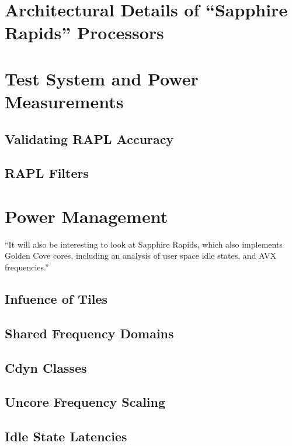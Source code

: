 \documentclass[conference,table,xcdraw,10pt,final]{IEEEtran}
\begin{document}
	\section{Architectural Details of “Sapphire Rapids” Processors}

	\section{Test System and Power Measurements}

	\subsection{Validating RAPL Accuracy}

	\subsection{RAPL Filters}

	\section{Power Management}
	``It will also be interesting to look at Sapphire Rapids, which also implements Golden Cove cores, including an analysis of user space idle states, and AVX frequencies.''

	\subsection{Infuence of Tiles}

	\subsection{Shared Frequency Domains}

	\subsection{Cdyn Classes}

	\subsection{Uncore Frequency Scaling}

	\subsection{Idle State Latencies}
\end{document}
